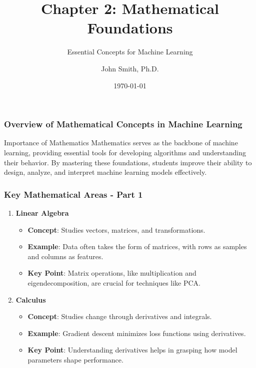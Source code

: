 \documentclass[aspectratio=169]{beamer}
\title[Mathematical Foundations]{Chapter 2: Mathematical Foundations}
\subtitle{Essential Concepts for Machine Learning}
\author[J. Smith]{John Smith, Ph.D.}
\institute[University Name]{
  Department of Computer Science\\
  University Name\\
  \vspace{0.3cm}
  Email: email@university.edu\\
  Website: www.university.edu
}
\date{\today}
\begin{document}
\frame{\titlepage}

\begin{frame}[fragile]
    \titlepage
\end{frame}

\begin{frame}[fragile]
    \frametitle{Overview of Mathematical Concepts in Machine Learning}
    \begin{block}{Importance of Mathematics}
        Mathematics serves as the backbone of machine learning, providing essential tools for developing algorithms and understanding their behavior. 
        By mastering these foundations, students improve their ability to design, analyze, and interpret machine learning models effectively.
    \end{block}
\end{frame}

\begin{frame}[fragile]
    \frametitle{Key Mathematical Areas - Part 1}
    \begin{enumerate}
        \item \textbf{Linear Algebra}
            \begin{itemize}
                \item \textbf{Concept}: Studies vectors, matrices, and transformations.
                \item \textbf{Example}: Data often takes the form of matrices, with rows as samples and columns as features.
                \item \textbf{Key Point}: Matrix operations, like multiplication and eigendecomposition, are crucial for techniques like PCA.
            \end{itemize}
        \item \textbf{Calculus}
            \begin{itemize}
                \item \textbf{Concept}: Studies change through derivatives and integrals.
                \item \textbf{Example}: Gradient descent minimizes loss functions using derivatives.
                \item \textbf{Key Point}: Understanding derivatives helps in grasping how model parameters shape performance.
            \end{itemize}
    \end{enumerate}
\end{frame}
\end{document}
